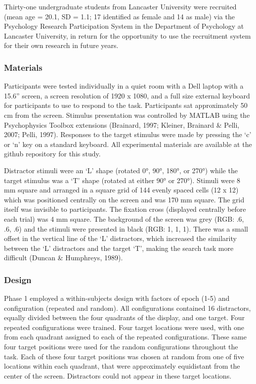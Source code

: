 \documentclass[
  man,
  floatsintext,
  longtable,
  nolmodern,
  notxfonts,
  notimes,
  colorlinks=true,linkcolor=blue,citecolor=blue,urlcolor=blue]{apa7}
\begin{document}
Thirty-one undergraduate students from Lancaster University were
recruited (mean age = 20.1, SD = 1.1; 17 identified as female and 14 as
male) via the Psychology Research Participation System in the Department
of Psychology at Lancaster University, in return for the opportunity to
use the recruitment system for their own research in future years.

\subsubsection{Materials}\label{materials}

Participants were tested individually in a quiet room with a Dell laptop
with a 15.6'' screen, a screen resolution of 1920 x 1080, and a full
size external keyboard for participants to use to respond to the task.
Participants sat approximately 50 cm from the screen. Stimulus
presentation was controlled by MATLAB using the Psychophysics Toolbox
extensions (Brainard, 1997; Kleiner, Brainard \& Pelli, 2007; Pelli,
1997). Responses to the target stimulus were made by pressing the `c' or
`n' key on a standard keyboard. All experimental materials are available
at the github repository for this study.

Distractor stimuli were an `L' shape (rotated 0°, 90°, 180°, or 270°)
while the target stimulus was a `T' shape (rotated at either 90° or
270°). Stimuli were 8 mm square and arranged in a square grid of 144
evenly spaced cells (12 x 12) which was positioned centrally on the
screen and was 170 mm square. The grid itself was invisible to
participants. The fixation cross (displayed centrally before each trial)
was 4 mm square. The background of the screen was grey (RGB: .6, .6, .6)
and the stimuli were presented in black (RGB: 1, 1, 1). There was a
small offset in the vertical line of the `L' distractors, which
increased the similarity between the `L' distractors and the target `T',
making the search task more difficult (Duncan \& Humphreys, 1989).

\subsubsection{Design}\label{design}

Phase 1 employed a within-subjects design with factors of epoch (1-5)
and configuration (repeated and random). All configurations contained 16
distractors, equally divided between the four quadrants of the display,
and one target. Four repeated configurations were trained. Four target
locations were used, with one from each quadrant assigned to each of the
repeated configurations. These same four target positions were used for
the random configurations throughout the task. Each of these four target
positions was chosen at random from one of five locations within each
quadrant, that were approximately equidistant from the center of the
screen. Distractors could not appear in these target locations.
\end{document}
